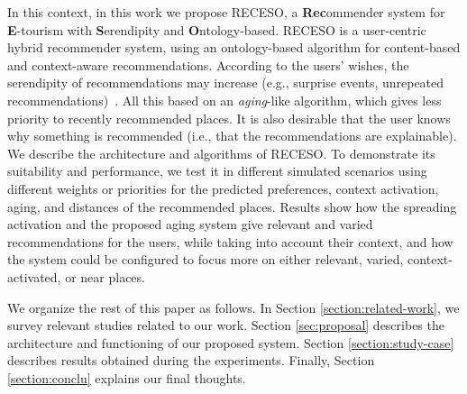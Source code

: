 In this context, in this work we propose RECESO, a {\bf Rec}ommender system for {\bf E}-tourism with {\bf S}erendipity and {\bf O}ntology-based. RECESO is
a user-centric hybrid recommender system, using an ontology-based algorithm for content-based and context-aware recommendations. According to the users’ wishes, the serendipity of recommendations may increase (e.g., surprise events, unrepeated recommendations)~\cite{kotkov2016survey}. All this based on an {\it aging}-like algorithm, which gives less priority to recently recommended places.  It is also desirable that the user knows why something is recommended (i.e., that the recommendations are explainable). We describe the architecture and algorithms of RECESO.
To demonstrate its suitability and performance, we test it in different simulated scenarios using different weights or priorities for the predicted preferences, context activation, aging, and distances of the recommended places. Results show how the spreading activation and the proposed aging system give relevant and varied recommendations for the users, while taking into account their context, and how the system could be configured to focus more on either relevant, varied, context-activated, or near places. 

We organize the rest of this paper as follows. In Section \ref{section:related-work}, we survey 
relevant studies related to our work.
Section \ref{sec:proposal} describes the architecture and functioning of our proposed system. Section \ref{section:study-case} describes results obtained during the experiments. Finally, Section \ref{section:conclu} explains our final thoughts.


